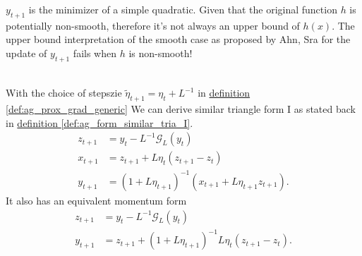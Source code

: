 \documentclass[12pt]{article}
\begin{document}
            \begin{remark}
                $y_{t + 1}$ is the minimizer of a simple quadratic. 
                Given that the original function $h$ is potentially non-smooth, therefore it's not always an upper bound of $h(x)$. 
                The upper bound interpretation of the smooth case as proposed by Ahn, Sra for the update of $y_{t + 1}$ fails when $h$ is non-smooth! 
            \end{remark}

            \begin{lemma}
                \quad \\
                With the choice of stepszie $\tilde \eta_{t + 1} = \eta_t + L^{-1}$ 
                in 
                \hyperref[def:ag_prox_grad_generic]{definition \ref*{def:ag_prox_grad_generic}}
                We can derive similar triangle form I as stated back in
                \hyperref[def:ag_form_similar_tria_I]{definition \ref*{def:ag_form_similar_tria_I}}. 
                \begin{align*}
                    z_{t + 1} &= y_t - L^{-1} \mathcal G_L(y_t)
                    \\
                    x_{t + 1} &= z_{t + 1} + L\eta_t (z_{t + 1} - z_t)
                    \\
                    y_{t + 1} &= 
                    (1 + L\eta_{t + 1})^{-1}
                    (
                    x_{t + 1} + L\eta_{t + 1}z_{t + 1}
                    ). 
                \end{align*}
                It also has an equivalent momentum form 
                \begin{align*}
                    z_{t + 1} &= y_t - L^{-1}\mathcal G_L(y_t)
                    \\
                    y_{t + 1} &= z_{t + 1} + (1 + L\eta_{t + 1})^{-1}L\eta_t (z_{t + 1} - z_t). 
                \end{align*}
            \end{lemma}
\end{document}
